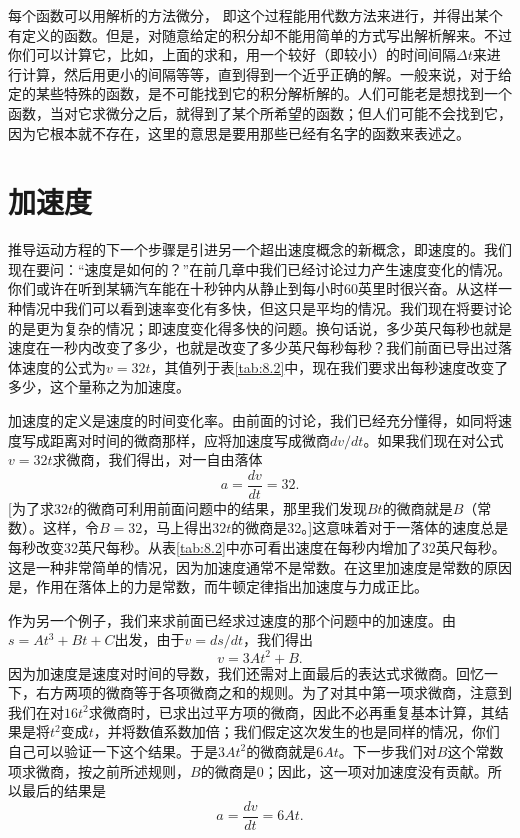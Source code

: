 每个函数可以用解析的方法微分， 即这个过程能用代数方法来进行，并得出某个有定义的函数。但是，对随意给定的积分却不能用简单的方式写出解析解来。不过你们可以计算它，比如，上面的求和，用一个较好（即较小）的时间间隔$\Delta t$来进行计算，然后用更小的间隔等等，直到得到一个近乎正确的解。一般来说，对于给定的某些特殊的函数，是不可能找到它的积分解析解的。人们可能老是想找到一个函数，当对它求微分之后，就得到了某个所希望的函数；但人们可能不会找到它，因为它根本就不存在，这里的意思是要用那些已经有名字的函数来表述之。




\section{加速度}

推导运动方程的下一个步骤是引进另一个超出速度概念的新概念，即速度的。我们现在要问：“速度是如何的？”在前几章中我们已经讨论过力产生速度变化的情况。你们或许在听到某辆汽车能在十秒钟内从静止到每小时60英里时很兴奋。从这样一种情况中我们可以看到速率变化有多快，但这只是平均的情况。我们现在将要讨论的是更为复杂的情况；即速度变化得多快的问题。换句话说，多少英尺每秒也就是速度在一秒内改变了多少，也就是改变了多少英尺每秒每秒？我们前面已导出过落体速度的公式为$v=32t$，其值列于表\ref{tab:8.2}中，现在我们要求出每秒速度改变了多少，这个量称之为加速度。

加速度的定义是速度的时间变化率。由前面的讨论，我们已经充分懂得，如同将速度写成距离对时间的微商那样，应将加速度写成微商$dv/dt$。如果我们现在对公式$v=32t$求微商，我们得出，对一自由落体
\begin{equation}
\label{Eq:I:8:9}
a=\frac{dv}{dt}=32.
\end{equation}
[为了求$32t$的微商可利用前面问题中的结果，那里我们发现$Bt$的微商就是$B$（常数）。这样，令$B=32$，马上得出$32t$的微商是32。]这意味着对于一落体的速度总是每秒改变32英尺每秒。从表\ref{tab:8.2}中亦可看出速度在每秒内增加了32英尺每秒。这是一种非常简单的情况，因为加速度通常不是常数。在这里加速度是常数的原因是，作用在落体上的力是常数，而牛顿定律指出加速度与力成正比。

作为另一个例子，我们来求前面已经求过速度的那个问题中的加速度。由$s=At^3+Bt+C$出发，由于$v=ds/dt$，我们得出
\begin{equation*}
v=3At^2+B.
\end{equation*}
因为加速度是速度对时间的导数，我们还需对上面最后的表达式求微商。回忆一下，右方两项的微商等于各项微商之和的规则。为了对其中第一项求微商，注意到我们在对$16t^2$求微商时，已求出过平方项的微商，因此不必再重复基本计算，其结果是将$t^2$变成$t$，并将数值系数加倍；我们假定这次发生的也是同样的情况，你们自己可以验证一下这个结果。于是$3At^2$的微商就是$6At$。下一步我们对$B$这个常数项求微商，按之前所述规则，$B$的微商是0；因此，这一项对加速度没有贡献。所以最后的结果是
\begin{equation*}
a=\frac{dv}{dt}=6At.
\end{equation*}

